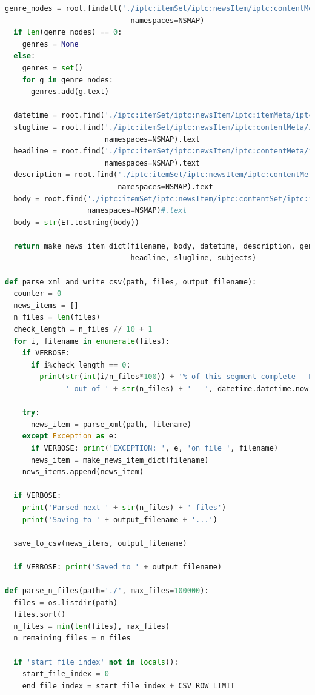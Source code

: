 \documentclass[11pt]{article}
\begin{document}
\begin{lstlisting}[language=Python]
  genre_nodes = root.findall('./iptc:itemSet/iptc:newsItem/iptc:contentMeta/iptc:genre/iptc:name',\
                             namespaces=NSMAP)
  if len(genre_nodes) == 0:
    genres = None
  else:
    genres = set()
    for g in genre_nodes:
      genres.add(g.text)

  datetime = root.find('./iptc:itemSet/iptc:newsItem/iptc:itemMeta/iptc:firstCreated', namespaces=NSMAP).text
  slugline = root.find('./iptc:itemSet/iptc:newsItem/iptc:contentMeta/iptc:slugline',\
                       namespaces=NSMAP).text
  headline = root.find('./iptc:itemSet/iptc:newsItem/iptc:contentMeta/iptc:headline',\
                       namespaces=NSMAP).text
  description = root.find('./iptc:itemSet/iptc:newsItem/iptc:contentMeta/iptc:description',\
                          namespaces=NSMAP).text
  body = root.find('./iptc:itemSet/iptc:newsItem/iptc:contentSet/iptc:inlineXML/xhtml:html/xhtml:body',\
                   namespaces=NSMAP)#.text
  body = str(ET.tostring(body))

  return make_news_item_dict(filename, body, datetime, description, genres, guid,\
                             headline, slugline, subjects)

def parse_xml_and_write_csv(path, files, output_filename):
  counter = 0
  news_items = []
  n_files = len(files)
  check_length = n_files // 10 + 1
  for i, filename in enumerate(files):
    if VERBOSE:
      if i%check_length == 0:
        print(str(int(i/n_files*100)) + '% of this segment complete - Parsing file ' + str(i) + \
              ' out of ' + str(n_files) + ' - ', datetime.datetime.now())

    try:
      news_item = parse_xml(path, filename)
    except Exception as e:
      if VERBOSE: print('EXCEPTION: ', e, 'on file ', filename)
      news_item = make_news_item_dict(filename)
    news_items.append(news_item)

  if VERBOSE:
    print('Parsed next ' + str(n_files) + ' files')
    print('Saving to ' + output_filename + '...')

  save_to_csv(news_items, output_filename)

  if VERBOSE: print('Saved to ' + output_filename)

def parse_n_files(path='./', max_files=100000):
  files = os.listdir(path)
  files.sort()
  n_files = min(len(files), max_files)
  n_remaining_files = n_files

  if 'start_file_index' not in locals():
    start_file_index = 0
    end_file_index = start_file_index + CSV_ROW_LIMIT


\end{lstlisting}
\end{document}
